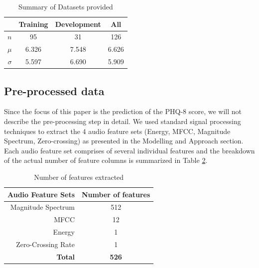 \documentclass{article}
\begin{document}
 	\begin{table}[h]
 		\begin{center}
  			\begin{tabular}{ | r | c | c | c | }
    			\hline
			 		& \bfseries Training	& \bfseries Development 	& \bfseries All \\ \hline
			 $n$		& 95 			& 31 				& 126 \\ \hline
			 $\mu$	& 6.326 		& 7.548			& 6.626 \\ \hline
			 $\sigma$	& 5.597 		& 6.690 			& 5.909 \\ \hline
			 \end{tabular}
		\end{center}
 	\caption{Summary of Datasets provided}
 	\label{summary_table}
 	\end{table}

	\subsection{Pre-processed data}
	Since the focus of this paper is the prediction of the PHQ-8 score, we will not describe the pre-processing step in detail.
	We used standard signal processing techniques to extract the 4 audio feature sets (Energy, MFCC, Magnitude Spectrum, Zero-crossing) as presented in the Modelling 
	and Approach section.
	Each audio feature set comprises of several individual features and the breakdown of the actual number of feature columns is summarized in Table \ref{no_features}.

 	\begin{table}[h]
 		\begin{center}
  			\begin{tabular}{ | r | c | }
    			\hline
			 \bfseries Audio Feature Sets 	& \bfseries Number of features \\ \hline
			 Magnitude Spectrum		& 512 \\ \hline
			 MFCC 				& 12 \\ \hline
			 Energy 				& 1 \\ \hline
			 Zero-Crossing Rate 		& 1 \\ \hline
			 \bfseries Total			& \bfseries 526 \\ \hline
			 \end{tabular}
		\end{center}
 	\caption{Number of features extracted}
 	\label{no_features}
 	\end{table}
\end{document}
